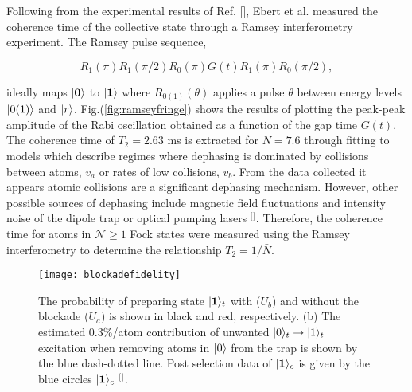 Following from the experimental results of Ref. [], Ebert et al. measured the coherence time of the collective state through a Ramsey interferometry experiment. The Ramsey pulse sequence,

\begin{equation}
\label{eq:pulsesequence1}
R_{1}(\pi)R_{1}(\pi /2)R_{0}(\pi)G(t)R_{1}(\pi)R_{0}(\pi /2),
\end{equation}
  


\noindent ideally maps $\lvert\textbf{0}\rangle$ to $\lvert\textbf{1}\rangle$ where $R_{0(1)}(\theta)$ applies a pulse $\theta$ between energy levels $\lvert0(1)\rangle$ and $\lvert r\rangle$. Fig.(\ref{fig:ramseyfringe}) shows the results of plotting the peak-peak amplitude of the Rabi oscillation obtained as a function of the gap time $G(t)$. The coherence time of $T_{2}=2.63$ ms is extracted for $\bar{N}=7.6$ through fitting to models which describe regimes where dephasing is dominated by  collisions between atoms, $v_{a}$ or rates of low collisions, $v_{b}$. From the data collected it appears atomic collisions are a significant dephasing mechanism. However, other possible sources of dephasing include magnetic field fluctuations and intensity noise of the dipole trap or optical pumping lasers $^{[}$\citep{Saffman2005AnalysisAtoms}$^{]}$. Therefore, the coherence time for atoms in $\mathcal{N} \geq 1$ Fock states were measured using the Ramsey interferometry to determine the relationship $T_{2}=1/\bar{N}$. 


\begin{figure}[t]
\centering
\texttt{[image: blockadefidelity]}
\caption{\label{fig:blockadefidelity} The probability of preparing state $\lvert\textbf{1}\rangle_{t}$ with ($U_{b}$) and without the blockade ($U_{a}$) is shown in black and red, respectively. (b) The estimated 0.3\%/atom contribution of unwanted $\lvert0\rangle_{t}\rightarrow\lvert1\rangle_{t}$ excitation when removing atoms in $\lvert0\rangle$ from the trap is shown by the blue dash-dotted line. Post selection data of $\lvert\textbf{1}\rangle_{c}$ is given by the blue circles $\lvert\textbf{1}\rangle_{c}$ $^{[}$\citep{Ebert2015CoherenceQubits}$^{]}$.}
\end{figure}

